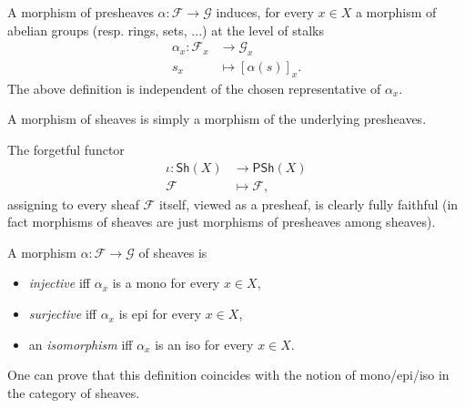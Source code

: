 \documentclass[../Main]{subfiles}
\begin{document}
\begin{rem}
	A morphism of presheaves $\alpha\colon \mathcal{F} \to \mathcal{G}$ induces,
	for every $x \in X$ a morphism of abelian groups (resp. rings, sets, ...)
	at the level of stalks
	\begin{align}
		\alpha_x: \mathcal{F}_x &\longrightarrow \mathcal{G}_x \\
		s_x &\longmapsto \left[ \alpha(s) \right]_x \nonumber
	.\end{align} 
	The above definition is independent of the chosen representative of $\alpha_x$.
\end{rem}

\begin{defn}
	A morphism of sheaves is simply a morphism of the underlying presheaves.
\end{defn}

\begin{rem}
	The forgetful functor 
	\begin{align}
		\iota: \mathsf{Sh}(X) &\longrightarrow \mathsf{PSh}(X) \\
		\mathcal{F} &\longmapsto \mathcal{F} \nonumber
	,\end{align} 
	assigning to every sheaf $\mathcal{F}$ itself, viewed as a presheaf,
	is clearly fully faithful (in fact morphisms of sheaves are just morphisms
	of presheaves among sheaves).
\end{rem}

\begin{defn}
	A morphism $\alpha\colon \mathcal{F} \to \mathcal{G}$ of sheaves is
	\begin{itemize}
		\item {\em injective} iff $\alpha_x$ is a mono for every
			$x \in X$,
		\item {\em surjective} iff $\alpha_x$ is epi for every
			$x \in X$,
		\item an {\em isomorphism} iff $\alpha_x$ is an iso for every
			$x \in X$.
	\end{itemize}
	One can prove that this definition coincides with the notion
	of mono/epi/iso in the category of sheaves.
\end{defn}
\end{document}

